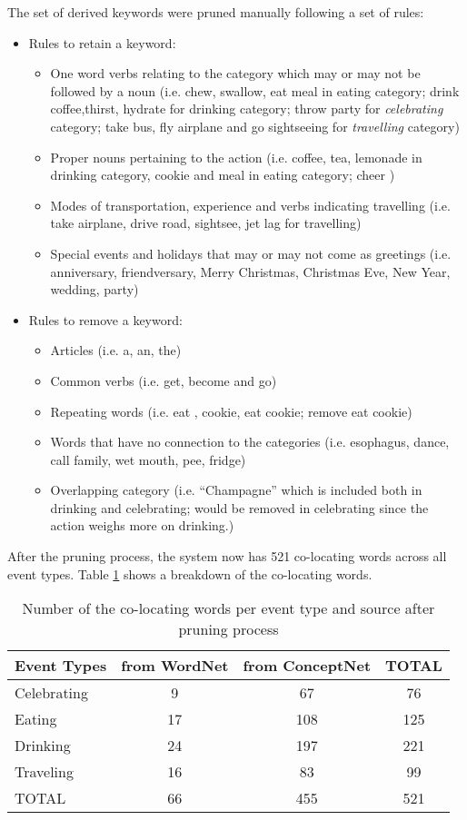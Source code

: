 The set of derived keywords were pruned manually following a set of rules:
\begin{itemize}
	\item Rules to retain a keyword:
	\begin{itemize}
		\item 	One word verbs relating to the category which may or may not be followed by a noun (i.e. chew, swallow, eat meal in eating category; drink coffee,thirst, hydrate for drinking category; throw party for \textit{celebrating} category; take bus, fly airplane and go sightseeing for \textit{travelling} category)
		\item Proper nouns pertaining to the action (i.e. coffee, tea, lemonade in drinking category, cookie and meal in eating category; cheer )
		\item Modes of transportation, experience and verbs indicating travelling (i.e. take airplane, drive road, sightsee, jet lag for travelling)
		\item Special events and holidays that may or may not come as greetings (i.e. anniversary, friendversary, Merry Christmas, Christmas Eve, New Year, wedding, party)
	\end{itemize}
	\item Rules to remove a keyword:
	\begin{itemize}
		\item Articles (i.e. a, an, the)
		\item Common verbs (i.e. get, become and go) 
		\item Repeating words (i.e. eat , cookie, eat cookie; remove eat cookie)
		\item Words that have no connection to the categories (i.e. esophagus, dance, call family, wet mouth, pee, fridge)
		\item Overlapping category (i.e. ``Champagne'' which is included both in drinking and celebrating; would be removed in celebrating since the action weighs more on drinking.)
	\end{itemize}
\end{itemize}

After the pruning process, the system now has 521 co-locating words across all event types. Table \ref{tab:pruning-result} shows a breakdown of the co-locating words.
\begin{table}[ph!]   %
	\centering
	\caption{Number of the co-locating words per event type and source after pruning process} \vspace{0.25em}
	\begin{tabular}{|p{1in}|c|c|c|} \hline
		\centering Event Types & from WordNet & from ConceptNet & TOTAL \\ \hline
		Celebrating & 9 & 67 & 76 \\ \hline
		Eating & 17 & 108 & 125 \\ \hline
		Drinking & 24 & 197 & 221 \\ \hline
		Traveling & 16 & 83 & 99 \\ \hline
		TOTAL & 66 & 455 & 521 \\ \hline
	\end{tabular}
	\label{tab:pruning-result}
\end{table}

